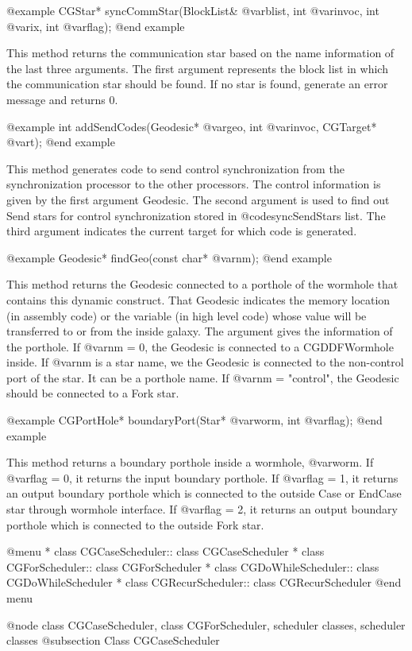 {@example
CGStar* syncCommStar(BlockList& @var{blist}, int @var{invoc}, int @var{ix}, int @var{flag});
@end example

This method returns the communication star based on the name information of
the last three arguments. 
The first argument represents the block list in which the communication star
should be found. If no star is found, generate an error message and returns 0.

@example
int addSendCodes(Geodesic* @var{geo}, int @var{invoc}, CGTarget* @var{t});
@end example

This method generates code to send control synchronization from the
synchronization processor to the other processors. The control
information is given by the first argument Geodesic. The second
argument is used to find out Send stars for control synchronization
stored in @code{syncSendStars} list. The third argument indicates the
current target for which code is generated.

@example
Geodesic* findGeo(const char* @var{nm});
@end example

This method returns the Geodesic connected to a porthole of the wormhole
that contains this dynamic construct. That Geodesic indicates the memory
location (in assembly code) or the variable (in high level code) whose
value will be transferred to or from the inside galaxy. The argument
gives the information of the porthole. If @var{nm} = 0, the Geodesic
is connected to a CGDDFWormhole inside. If @var{nm} is a star name, we
the Geodesic is connected to the non-control port of the star. It can be
a porthole name. If @var{nm} = "control", the Geodesic should be connected
to a Fork star.

@example
CGPortHole* boundaryPort(Star* @var{worm}, int @var{flag});
@end example

This method returns a boundary porthole inside a wormhole, @var{worm}.
If @var{flag} = 0, it returns the input boundary porthole. If @var{flag} = 1,
it returns an output boundary porthole which is connected to the outside
Case or EndCase star through wormhole interface. 
If @var{flag} = 2, it returns an output boundary porthole
which is connected to the outside Fork star.

@menu
* class CGCaseScheduler::		class CGCaseScheduler
* class CGForScheduler::		class CGForScheduler
* class CGDoWhileScheduler::		class CGDoWhileScheduler
* class CGRecurScheduler::		class CGRecurScheduler
@end menu

@node class CGCaseScheduler, class CGForScheduler, scheduler classes, scheduler classes
@subsection Class CGCaseScheduler

}
